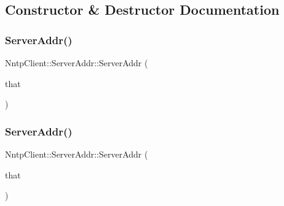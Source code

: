 \subsection{Constructor \& Destructor Documentation}
\hypertarget{class_nntp_client_1_1_server_addr_a19b0e0ac59d127ccdadeed1367295c3e}{}\label{class_nntp_client_1_1_server_addr_a19b0e0ac59d127ccdadeed1367295c3e} 
\subsubsection{\texorpdfstring{Server\+Addr()}{ServerAddr()}\hspace{0.1cm}{\footnotesize\ttfamily [1/6]}}
{\footnotesize\ttfamily Nntp\+Client\+::\+Server\+Addr\+::\+Server\+Addr (\begin{DoxyParamCaption}\item[{const \hyperlink{class_nntp_client_1_1_server_addr}{Server\+Addr} \&}]{that }\end{DoxyParamCaption})}

\hypertarget{class_nntp_client_1_1_server_addr_aca3ce7af4fab5298a40a0dbe0822918c}{}\label{class_nntp_client_1_1_server_addr_aca3ce7af4fab5298a40a0dbe0822918c} 
\subsubsection{\texorpdfstring{Server\+Addr()}{ServerAddr()}\hspace{0.1cm}{\footnotesize\ttfamily [2/6]}}
{\footnotesize\ttfamily Nntp\+Client\+::\+Server\+Addr\+::\+Server\+Addr (\begin{DoxyParamCaption}\item[{\hyperlink{class_nntp_client_1_1_server_addr}{Server\+Addr} \&\&}]{that }\end{DoxyParamCaption})}

\hypertarget{class_nntp_client_1_1_server_addr_a28e3e20d782edd97a25848bd5875d51a}{}\label{class_nntp_client_1_1_server_addr_a28e3e20d782edd97a25848bd5875d51a} 
